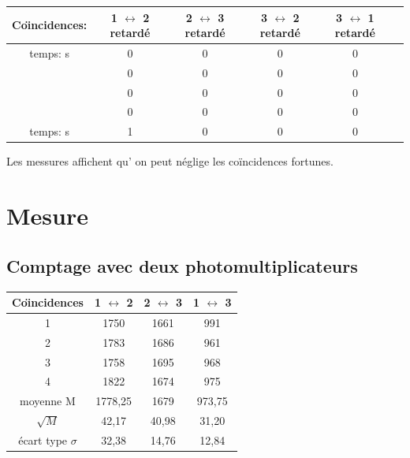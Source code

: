 \documentclass[a4paper,11pt,liststotocnumbered,bibtotocnumbered]{scrartcl}
\begin{document}
  \begin{tabular}{c|c|c|c|c|c}
Co\"{\i}ncidences:	&	1 $\leftrightarrow$ 2 retardé	&	2 $\leftrightarrow$ 3 retardé	&	3 $\leftrightarrow$ 2 retardé	&	3 $\leftrightarrow$ 1 retardé	\\ \hline	

temps:	\unit[10]{s} &	0	&	0	&	0	&	0	\\
	&	0	&	0	&	0	&	0	\\
	&	0	&	0	&	0	&	0	\\
	&	0	&	0	&	0	&	0	\\ \hline
temps: \unit[100]{s}	&	1	&	0	&	0	&	0	\\
\end{tabular}
\newline
Les messures affichent qu' on peut néglige les co\"{i}ncidences fortunes.



 \section{Mesure}
\subsection{Comptage avec deux photomultiplicateurs}
  \begin{tabular}{c|c|c|c}
Co\"{\i}ncidences	&	 1 $\leftrightarrow$ 2	&	2 $\leftrightarrow$ 3	&	 1 $\leftrightarrow$ 3	\\ \hline
1	&	1750	&	1661	&	991	\\
2	&	1783	&	1686	&	961	\\
3	&	1758	&	1695	&	968	\\
4	&	1822	&	1674	&	975	\\ \hline
moyenne M	&	1778,25	&	1679	&	973,75	\\
$\sqrt M$	&	42,17	&	40,98	&	31,20	\\
écart type $\sigma$	&	32,38	&	14,76	&	12,84	\\
\end{tabular}
\end{document}
